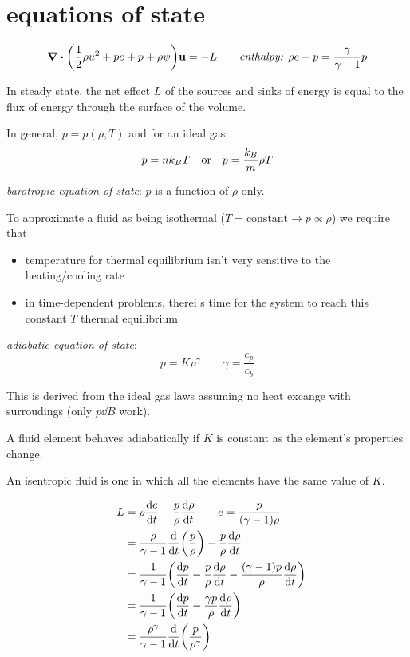 \documentclass[10pt, a4paper, twocolumn]{article}
\newcommand{\deff}[1]{\par \noindent \textit{#1}: }
\begin{document}
\section{equations of state}

\[\div\pqty{\frac12\rho u^2
+pe+p+\rho \psi}\vb u=-L
\qquad\textit{enthalpy: }
\rho e+p=\frac{\gamma}{\gamma-1}p
\]

In steady state, the net effect $L$ of the sources and sinks of energy is equal to the flux of energy through the surface of the volume.

In general, $p=p(\rho,T)$ and for an ideal gas:
\[p=nk_BT
\qq{or}
p=\frac{k_B}{m}\rho T\]

\deff{barotropic equation of state}
$p$ is a function of $\rho$ only.

To approximate a fluid as being isothermal
($T=\text{constant}
\longrightarrow p\propto\rho$)
we require that
\begin{itemize}
\item temperature for thermal equilibrium isn't very sensitive to the heating/cooling rate
\item in time-dependent problems, therei s time for the system to reach this constant $T$ thermal equilibrium
\end{itemize}

\deff{adiabatic equation of state}
\[p=K\rho ^\gamma
\qquad \gamma = \frac{c_p}{c_b}\]

This is derived from the ideal gas laws assuming no heat excange with surroudings (only $p\dd B$ work).

A fluid element behaves adiabatically if $K$ is constant as the element's properties change.

An isentropic fluid is one in which all the elements have the same value of $K$.

\begin{equation*}
\begin{aligned}
-L&=\rho\dv{e}{t}-\frac{p}{\rho}\dv{\rho}{t}
\qquad e=\frac{p}{(\gamma-1)\rho}
\\& =\frac{\rho}{\gamma -1}
\dv{t}\pqty{\frac{p}{\rho}}
-\frac{p}{\rho}\dv{\rho}{t}
\\&=\frac{1}{\gamma -1}
\pqty{\dv{p}{t}-\frac{p}{\rho}\dv{\rho}{t}
-\frac{(\gamma -1)p}{\rho}\dv{\rho}{t}}
\\&=\frac{1}{\gamma -1}
\pqty{\dv{p}{t}-\frac{\gamma p}{\rho}
\dv{\rho}{t}}
\\&= \frac{\rho ^\gamma}{\gamma -1}
\dv{t}\pqty{\frac{p}{\rho ^\gamma}}
\end{aligned}
\end{equation*}
\end{document}
